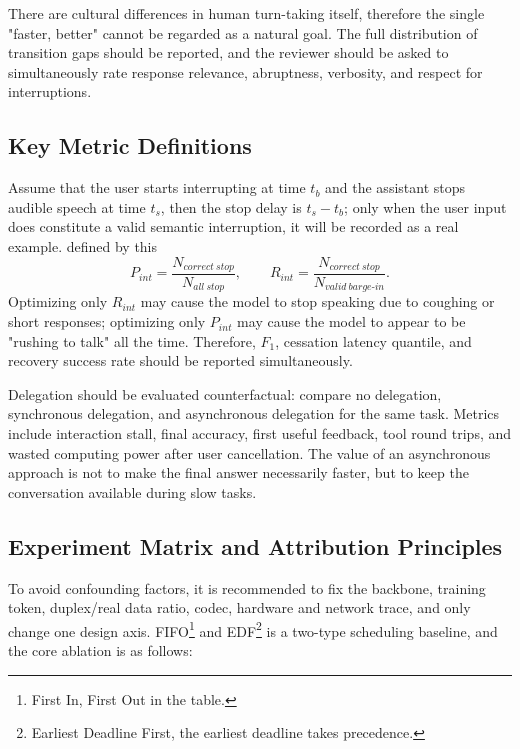 \documentclass[UTF8,fontset=none,a4paper,10pt]{ctexart}
\begin{document}
There are cultural differences in human turn-taking itself\cite{stivers2009turntaking}, therefore the single "faster, better" cannot be regarded as a natural goal. The full distribution of transition gaps should be reported, and the reviewer should be asked to simultaneously rate response relevance, abruptness, verbosity, and respect for interruptions.

\subsection{Key Metric Definitions}

Assume that the user starts interrupting at time $t_b$ and the assistant stops audible speech at time $t_s$, then the stop delay is $t_s-t_b$; only when the user input does constitute a valid semantic interruption, it will be recorded as a real example. defined by this
\begin{equation}
P_{int}=\frac{N_{correct\ stop}}{N_{all\ stop}},\qquad
R_{int}=\frac{N_{correct\ stop}}{N_{valid\ barge\mbox{-}in}}.
\end{equation}
Optimizing only $R_{int}$ may cause the model to stop speaking due to coughing or short responses; optimizing only $P_{int}$ may cause the model to appear to be "rushing to talk" all the time. Therefore, $F_1$, cessation latency quantile, and recovery success rate should be reported simultaneously.

Delegation should be evaluated counterfactual: compare no delegation, synchronous delegation, and asynchronous delegation for the same task. Metrics include interaction stall, final accuracy, first useful feedback, tool round trips, and wasted computing power after user cancellation. The value of an asynchronous approach is not to make the final answer necessarily faster, but to keep the conversation available during slow tasks.

\subsection{Experiment Matrix and Attribution Principles}

To avoid confounding factors, it is recommended to fix the backbone, training token, duplex/real data ratio, codec, hardware and network trace, and only change one design axis. FIFO\footnote{First In, First Out in the table. } and EDF\footnote{Earliest Deadline First, the earliest deadline takes precedence. } is a two-type scheduling baseline, and the core ablation is as follows:
\end{document}
